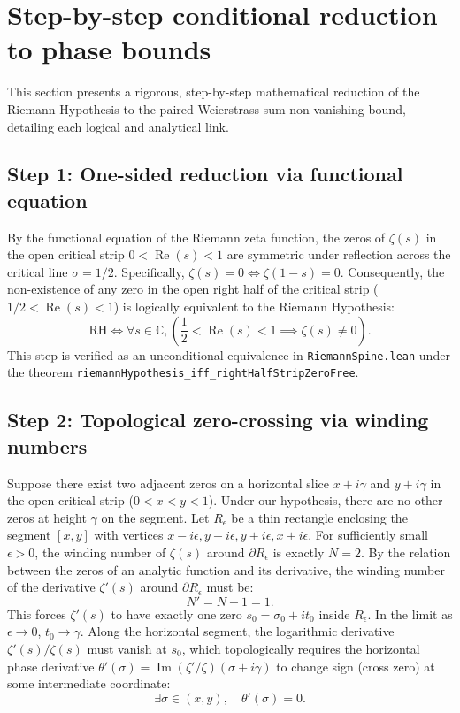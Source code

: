 \documentclass[11pt]{amsart}
\newcommand{\zetaR}{\zeta}
\newcommand{\re}{\operatorname{Re}}
\newcommand{\im}{\operatorname{Im}}
\newcommand{\lean}[1]{\texttt{#1}}
\begin{document}
\section{Step-by-step conditional reduction to phase bounds}

This section presents a rigorous, step-by-step mathematical reduction of the Riemann Hypothesis to the paired Weierstrass sum non-vanishing bound, detailing each logical and analytical link.

\subsection{Step 1: One-sided reduction via functional equation}
By the functional equation of the Riemann zeta function, the zeros of $\zetaR(s)$ in the open critical strip $0 < \re(s) < 1$ are symmetric under reflection across the critical line $\sigma = 1/2$. Specifically, $\zetaR(s) = 0 \iff \zetaR(1-s) = 0$. Consequently, the non-existence of any zero in the open right half of the critical strip ($1/2 < \re(s) < 1$) is logically equivalent to the Riemann Hypothesis:
\[
  \mathrm{RH} \iff \forall s \in \mathbb{C}, \left( \frac{1}{2} < \re(s) < 1 \implies \zetaR(s) \neq 0 \right).
\]
This step is verified as an unconditional equivalence in \lean{RiemannSpine.lean} under the theorem \lean{riemannHypothesis\_iff\_rightHalfStripZeroFree}.

\subsection{Step 2: Topological zero-crossing via winding numbers}
Suppose there exist two adjacent zeros on a horizontal slice $x + i\gamma$ and $y + i\gamma$ in the open critical strip ($0 < x < y < 1$). Under our hypothesis, there are no other zeros at height $\gamma$ on the segment. Let $R_\epsilon$ be a thin rectangle enclosing the segment $[x, y]$ with vertices $x - i\epsilon, y - i\epsilon, y + i\epsilon, x + i\epsilon$. For sufficiently small $\epsilon > 0$, the winding number of $\zetaR(s)$ around $\partial R_\epsilon$ is exactly $N = 2$.
By the relation between the zeros of an analytic function and its derivative, the winding number of the derivative $\zetaR'(s)$ around $\partial R_\epsilon$ must be:
\[
  N' = N - 1 = 1.
\]
This forces $\zetaR'(s)$ to have exactly one zero $s_0 = \sigma_0 + i t_0$ inside $R_\epsilon$. In the limit as $\epsilon \to 0$, $t_0 \to \gamma$. Along the horizontal segment, the logarithmic derivative $\zetaR'(s)/\zetaR(s)$ must vanish at $s_0$, which topologically requires the horizontal phase derivative $\theta'(\sigma) = \im(\zetaR'/\zetaR)(\sigma + i\gamma)$ to change sign (cross zero) at some intermediate coordinate:
\[
  \exists \sigma \in (x, y), \quad \theta'(\sigma) = 0.
\]
\end{document}
